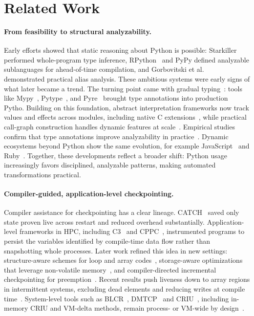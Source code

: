 \section{Related Work}
\label{sec:related}

\paragraph{From feasibility to structural analyzability.}
Early efforts showed that static reasoning about Python is possible: Starkiller~\cite{salib2004starkiller} performed whole-program type inference, RPython~\cite{ancona2007rpython} and PyPy defined analyzable sublanguages for ahead-of-time compilation, and Gorbovitski et al.~\cite{gorbovitski2010alias} demonstrated practical alias analysis. These ambitious systems were early signs of what later became a trend. The turning point came with gradual typing~\cite{siek2007gradual,vitousek2014design}: tools like Mypy~\cite{mypy}, Pytype~\cite{pytype}, and Pyre~\cite{pyre} brought type annotations into production Pytho. Building on this foundation, abstract interpretation frameworks now track values and effects across modules, including native C extensions~\cite{fromherz2018static,monat2021static,monat2021multilanguage}, while practical call-graph construction handles dynamic features at scale~\cite{salis2021pycg,rakamnouykit2024potohybridandersenspointsto}. Empirical studies confirm that type annotations improve analyzability in practice~\cite{bence2021unambiguity}. Dynamic ecosystems beyond Python show the same evolution, for example JavaScript~\cite{jensen2009type,kashyap2014jsai} and Ruby~\cite{furr2009static,kazerounian2021simtyper}. Together, these developments reflect a broader shift: Python usage increasingly favors disciplined, analyzable patterns, making automated transformations practical.

\paragraph{Compiler-guided, application-level checkpointing.}
Compiler assistance for checkpointing has a clear lineage. CATCH~\cite{li1990catch} saved only state proven live across restart and reduced overhead substantially. Application-level frameworks in HPC, including C3~\cite{bronevetsky2004application} and CPPC~\cite{rodriguez2010cppc}, instrumented programs to persist the variables identified by compile-time data flow rather than snapshotting whole processes. Later work refined this idea in new settings: structure-aware schemes for loop and array codes~\cite{elnawawy2017efficient}, storage-aware optimizations that leverage non-volatile memory~\cite{kannan2013optimizing}, and compiler-directed incremental checkpointing for preemption~\cite{ji2022compiler}. Recent results push liveness down to array regions in intermittent systems, excluding dead elements and reducing writes at compile time~\cite{kim2024lact}. System-level tools such as BLCR~\cite{hargrove2006berkeley}, DMTCP~\cite{AnselAryaCooperman2009DMTCP} and CRIU~\cite{CRIUProject}, including in-memory CRIU and VM-delta methods, remain process- or VM-wide by design~\cite{venkatesh2019fast,MoshikSOCC22}.

